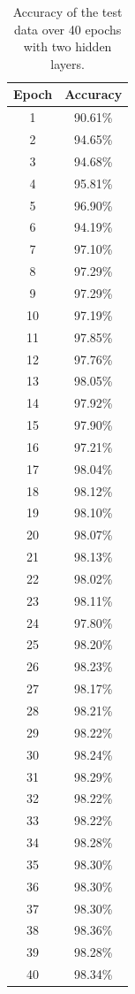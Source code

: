 \documentclass[a4paper]{article}
\begin{document}
\begin{table}[H]
	\centering
	\begin{tabular}{|c|c|}
		\hline
		Epoch & Accuracy \\
		\hline
		1 & 90.61\% \\
		\hline
		2 & 94.65\%\\
		\hline 
		3 & 94.68\%\\
		\hline 
		4 & 95.81\%\\
		\hline 
		5 & 96.90\%\\
		\hline 
		6 & 94.19\%\\
		\hline 
		7 & 97.10\%\\
		\hline 
		8 & 97.29\%\\
		\hline 
		9 & 97.29\%\\
		\hline 
		10 & 97.19\%\\
		\hline 
		11 & 97.85\%\\
		\hline 
		12 & 97.76\%\\
		\hline 
		13 & 98.05\%\\
		\hline 
		14 & 97.92\%\\
		\hline 
		15 & 97.90\%\\
		\hline 
		16 & 97.21\%\\
		\hline 
		17 & 98.04\%\\
		\hline 
        18 & 98.12\%\\
		\hline 19 & 98.10\%\\
		\hline 20 & 98.07\%\\
		\hline 21 & 98.13\%\\
		\hline 22 & 98.02\%\\
		\hline 23 & 98.11\%\\
		\hline 24 & 97.80\%\\
		\hline 25 & 98.20\%\\
		\hline 26 & 98.23\%\\
		\hline 27 & 98.17\%\\
		\hline 28 & 98.21\%\\
		\hline 29 & 98.22\%\\
		\hline 30 & 98.24\%\\
		\hline 31 & 98.29\%\\
		\hline 32 & 98.22\%\\
		\hline 33 & 98.22\%\\
		\hline 34 & 98.28\%\\
		\hline 35 & 98.30\%\\
		\hline 36 & 98.30\%\\
		\hline 
		37 & 98.30\%\\
		\hline 
		38 & 98.36\%\\
		\hline 
		39 & 98.28\%\\
		\hline 
		40 & 98.34\%\\
		\hline
	\end{tabular}
	\caption{Accuracy of the test data over 40 epochs with two hidden layers. }
	\label{tab2}
\end{table}
\end{document}
